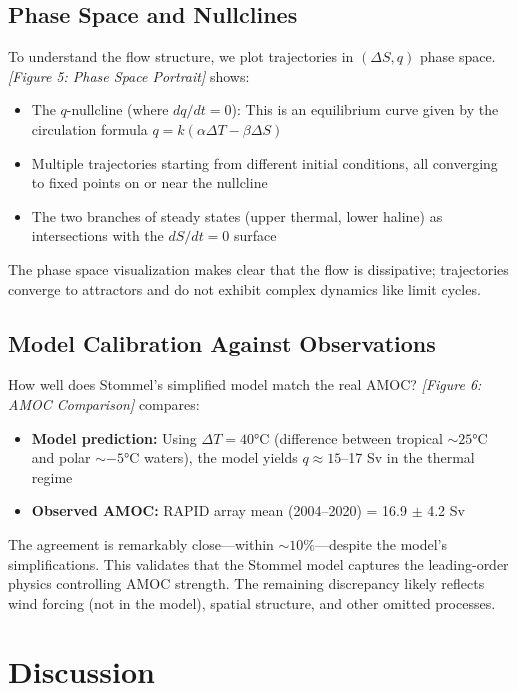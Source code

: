\documentclass[12pt,letterpaper]{article}
\begin{document}
\subsection{Phase Space and Nullclines}

To understand the flow structure, we plot trajectories in $(\Delta S, q)$ phase space. \textit{[Figure 5: Phase Space Portrait]} shows:

\begin{itemize}
\item The $q$-nullcline (where $dq/dt = 0$): This is an equilibrium curve given by the circulation formula $q = k(\alpha \Delta T - \beta \Delta S)$
\item Multiple trajectories starting from different initial conditions, all converging to fixed points on or near the nullcline
\item The two branches of steady states (upper thermal, lower haline) as intersections with the $dS/dt = 0$ surface
\end{itemize}

The phase space visualization makes clear that the flow is dissipative; trajectories converge to attractors and do not exhibit complex dynamics like limit cycles.

\subsection{Model Calibration Against Observations}

How well does Stommel's simplified model match the real AMOC? \textit{[Figure 6: AMOC Comparison]} compares:

\begin{itemize}
\item \textbf{Model prediction:} Using $\Delta T = 40$°C (difference between tropical $\sim 25$°C and polar $\sim -5$°C waters), the model yields $q \approx 15$--17 Sv in the thermal regime
\item \textbf{Observed AMOC:} RAPID array mean (2004--2020) = 16.9 $\pm$ 4.2 Sv
\end{itemize}

The agreement is remarkably close---within $\sim 10\%$---despite the model's simplifications. This validates that the Stommel model captures the leading-order physics controlling AMOC strength. The remaining discrepancy likely reflects wind forcing (not in the model), spatial structure, and other omitted processes.

\section{Discussion}
\end{document}

